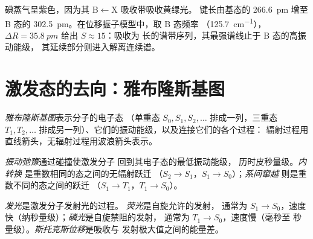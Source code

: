 \begin{example}[碘]\label{ex:b3:electronic-spectroscopy:iodine}
碘蒸气呈紫色，因为其 B$\leftarrow$X 吸收带吸收黄绿光。
键长由基态的 \qty{266.6}{pm} 增至
B 态的 \qty{302.5}{pm}。在位移振子模型中，取 B 态频率
（\qty{125.7}{cm^{-1}}），$\Delta R = \qty{35.8}{pm}$ 给出 $S \approx 15$：吸收为
长的谱带序列，其最强谱线止于 B 态的高振动能级，
其延续部分则进入解离连续谱。
\end{example}

\section{激发态的去向：雅布隆斯基图}

\begin{definition}[雅布隆斯基图]\label{def:b3:electronic-spectroscopy:jablonski}
\emph{雅布隆斯基图}表示分子的电子态
（单重态 $S_0, S_1, S_2, \dots$ 排成一列，三重态 $T_1, T_2,
\dots$ 排成另一列）、它们的振动能级，以及连接它们的各个过程：
辐射过程用直线箭头，无辐射过程用波浪箭头表示。
\end{definition}

\begin{definition}[无辐射过程]\label{def:b3:electronic-spectroscopy:radiationless}
\emph{振动弛豫}通过碰撞使激发分子
回到其电子态的最低振动能级，
历时皮秒量级。\emph{内转换}
是重数相同的态之间的无辐射跃迁
（$S_2 \to S_1$，$S_1 \to S_0$）；\emph{系间窜越}
则是重数不同的态之间的跃迁
（$S_1 \to T_1$，$T_1 \to S_0$）。
\end{definition}

\begin{definition}[发光、荧光、磷光、斯托克斯位移]\label{def:b3:electronic-spectroscopy:luminescence}
\emph{发光}是激发分子发射光的过程。
\emph{荧光}是自旋允许的发射，
通常为 $S_1 \to S_0$，速度快（纳秒量级）；\emph{磷光}是自旋禁阻的发射，
通常为 $T_1 \to S_0$，速度慢（毫秒至
秒量级）。\emph{斯托克斯位移}是吸收与
发射极大值之间的能量差。
\end{definition}

